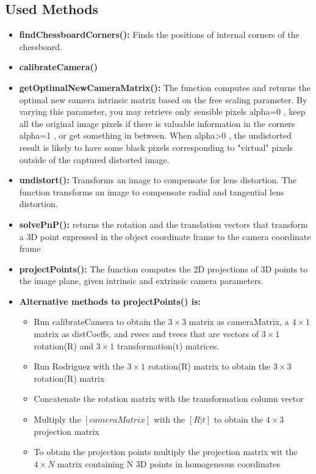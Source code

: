 \documentclass{article}
\begin{document}
\begin{itemize}
    \subsection{Used Methods}
    \begin{itemize}
        \item \textbf{findChessboardCorners():} Finds the positions of internal corners of the chessboard. 
        \item \textbf{calibrateCamera()}
        \item \textbf{getOptimalNewCameraMatrix():} The function computes and returns the optimal new camera intrinsic matrix based on the free scaling parameter. By varying this parameter, you may retrieve only sensible pixels alpha=0 , keep all the original image pixels if there is valuable information in the corners alpha=1 , or get something in between. When alpha>0 , the undistorted result is likely to have some black pixels corresponding to "virtual" pixels outside of the captured distorted image.
        \item \textbf{undistort():} Transforms an image to compensate for lens distortion. The function transforms an image to compensate radial and tangential lens distortion.
        \item \textbf{solvePnP():} returns the rotation and the translation vectors that transform a 3D point expressed in the object coordinate frame to the camera coordinate frame
        \item \textbf{projectPoints():} The function computes the 2D projections of 3D points to the image plane, given intrinsic and extrinsic camera parameters. 
        \item \textbf{Alternative methods to projectPoints() is:}
        \begin{itemize}
            \item Run calibrateCamera to obtain the \(3 \times 3\) matrix as cameraMatrix, a \(4 \times 1\) matrix as distCoeffs, and rvecs and tvecs that are vectors of \(3 \times 1\) rotation(R) and \(3 \times 1\) transformation(t) matrices.
            \item Run Rodriguez with the \(3 \times 1\) rotation(R) matrix to obtain the \(3 \times 3\) rotation(R) matrix
            \item Concatenate the rotation matrix with the transformation column vector
            \item Multiply the \([cameraMatrix]\) with the \([R|t]\) to obtain the \(4 \times 3\) projection matrix
            \item To obtain the projection points multiply the projection matrix wit the \(4 \times N\) matrix containing N 3D points in homogeneous coordinates
        \end{itemize}
    \end{itemize}





    

\end{itemize}
\end{document}
